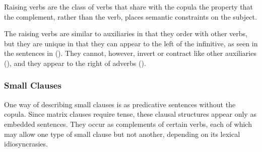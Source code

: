 Raising verbs are the class of verbs that share with the copula the property
that the complement, rather than the verb, places semantic constraints on
the subject.  



The raising verbs are similar to auxiliaries in that they order with other
verbs, but they are unique in that they can appear to the left of the
infinitive, as seen in the sentences in ({}).  They cannot, however, invert
or contract like other auxiliaries ({}), and they appear to the right of
adverbs ({}).




\subsubsection{Small Clauses}

One way of describing small clauses is as predicative sentences without the
copula.  Since matrix clauses require tense, these clausal structures appear
only as embedded sentences.  They occur as complements of certain verbs, each
of which may allow one type of small clause but not another, depending on its
lexical idiosyncrasies.




